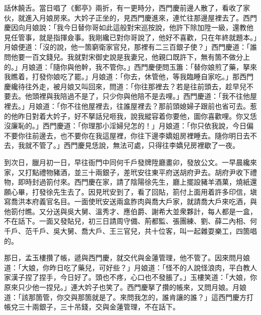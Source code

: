 話休饒舌。當日唱了《郵亭》兩折，有一更時分，西門慶前邊人散了，看收了家伙，就進入月娘房來。大妗子正坐的，見西門慶進來，連忙往那邊屋裡去了。西門慶因向月娘說：「我今日替你哥如此這般對宋巡按說，他許下除加陞一級，還教他見任管事，就是指揮僉事。我剛纔已對你哥說了，他好不喜歡，只在年終就題本。」月娘便道：「沒的說，他一箇窮衛家官兒，那裡有二三百銀子使？」西門慶道：「誰問他要一百文錢兒。我就對宋御史說是我妻兄，他親口既許下，無有箇不做分上的。」月娘道：「隨你與他幹，我不管你。」西門慶便問玉簫：「替你娘煎了藥，拏來我瞧着，打發你娘吃了罷。」月娘道：「你去，休管他，等我臨睡自家吃。」那西門慶纔待往外走，被月娘又叫回來，問道：「你往那裡去？若是往前頭去，趁早兒不要去。他頭裡與我陪過不是了，只少你與他陪不是去哩。」{}西門慶道：「我不往他屋裡去。」月娘道：「你不往他屋裡去，往誰屋裡去？那前頭媳婦子跟前也省可去。惹的他昨日對着大妗子，好不拏話兒咂我，說我縱容着你要他，圖你喜歡哩。你又恁沒廉恥的。」西門慶道：「你理那小淫婦兒怎的！」{}月娘道：「你只依我說，今日偏不要你往前邊去，也不要你在我這屋裡，你往下邊李嬌姐房裡睡去。隨你明日去不去，我就不管了。」西門慶見恁說，無法可處，只得往李嬌兒房裡歇了一夜。

到次日，臘月初一日，早往衙門中同何千戶發牌陞廳畫卯，發放公文。一早晨纔來家，又打點禮物豬酒，並三十兩銀子，差玳安往東平府送胡府尹去。胡府尹收下禮物，即時封過箚付來。西門慶在家，請了陰陽徐先生，廳上擺設豬羊酒菓，燒紙還願心畢，打發徐先生去了。因見玳安到了，看了回貼，箚付上面用着許多印信，塡寫喬洪本府義官名目。一面使玳安送兩盒胙肉與喬大戶家，就請喬大戶來吃酒，與他箚付瞧。又分送與吳大舅、溫秀才、應伯爵、謝希大並衆夥計，每人都是一盒，不在話下。一面又發貼兒，初三日請周守備、荊都監、張團練、劉、薛二內相、何千戶、范千戶、吳大舅、喬大戶、王三官兒，共十位客，叫一起雜耍樂工，四箇唱的。

那日，孟玉樓攢了帳，遞與西門慶，就交代與金蓮管理，他不管了。因來問月娘道：「大娘，你昨日吃了藥兒，可好些？」月娘道：「怪不的人說怪浪肉，平白教人家漢子捏了捏手，今日好了。{}頭也不疼，心口也不發脹了。」玉樓笑道：「大娘，你原來只少他一捏兒。」連大妗子也笑了。西門慶拏了攢的帳來，又問月娘。月娘道：「該那箇管，你交與那箇就是了。來問我怎的，誰肯讓的誰？」{}這西門慶方打帳兌三十兩銀子，三十吊錢，交與金蓮管理，不在話下。

